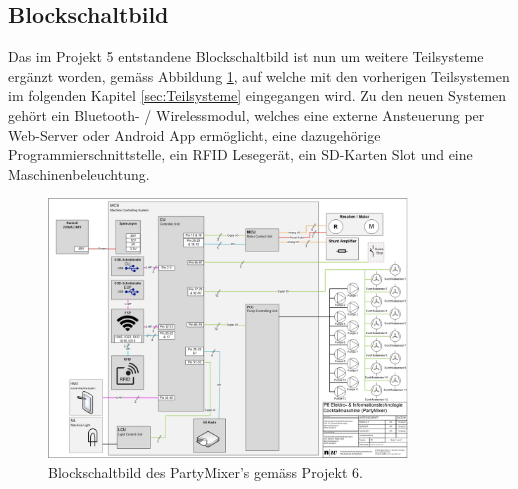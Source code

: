 \subsection{Blockschaltbild}
\label{subsec:Blockschaldbild}

Das im Projekt 5 entstandene Blockschaltbild ist nun um weitere Teilsysteme ergänzt worden, gemäss Abbildung \ref{fig:Blockschaltbild_Partymixer}, auf welche mit den vorherigen Teilsystemen im folgenden Kapitel \ref{sec:Teilsysteme} eingegangen wird. Zu den neuen Systemen gehört ein Bluetooth- / Wirelessmodul, welches eine externe Ansteuerung per Web-Server oder Android App ermöglicht, eine dazugehörige Programmierschnittstelle, ein RFID Lesegerät, ein SD-Karten Slot und eine Maschinenbeleuchtung.

\begin{figure}[h!]
\center
\includegraphics[angle=90, width = 0.85\textwidth]{graphics/Blockschaltbild}
\caption{Blockschaltbild des PartyMixer's gemäss Projekt 6.}
\label{fig:Blockschaltbild_Partymixer}
\end{figure}

\newpage

